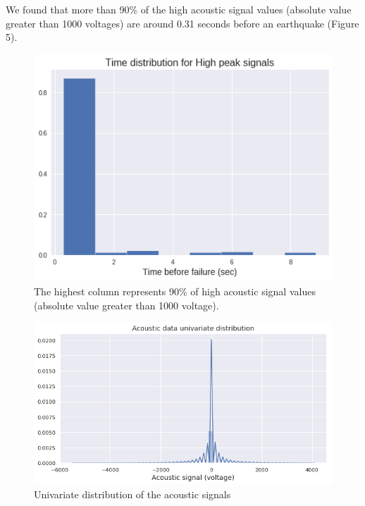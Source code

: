 \documentclass[]{llncs} %
\begin{document}
We found that more than 90\% of the high acoustic signal values (absolute value greater than 1000 voltages) are around 0.31 seconds before an earthquake (Figure 5). \par
\begin{figure}
	\centering
	\includegraphics[width=.8\linewidth]{timeDistribution}
	\caption{The highest column represents 90\% of high acoustic signal values (absolute value greater than 1000 voltage).}
	\label{fig:timeDistribution}
\end{figure}

\begin{figure}
	\centering
	\includegraphics[width=.9\linewidth]{acousticDataDistribution}
	\caption{Univariate distribution of the acoustic signals}
	\label{fig:acousticDataDistribution}
\end{figure}
\end{document}
